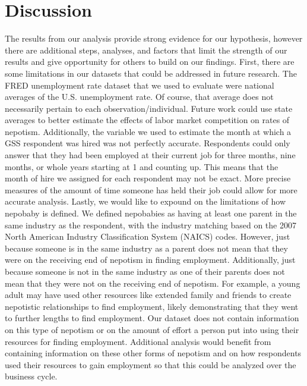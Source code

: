 \documentclass[12pt]{article}
\begin{document}
 



\section{Discussion}
\label{sec:discussion}
The results from our analysis provide strong evidence for our hypothesis, however there are additional steps, analyses, and factors that limit the strength of our results and give opportunity for others to build on our findings. First, there are some limitations in our datasets that could be addressed in future research. The FRED unemployment rate dataset that we used to evaluate were national averages of the U.S. unemployment rate. Of course, that average does not necessarily pertain to each observation/individual. Future work could use state averages to better estimate the effects of labor market competition on rates of nepotism. Additionally, the variable we used to estimate the month at which a GSS respondent was hired was not perfectly accurate. Respondents could only answer that they had been employed at their current job for three months, nine months, or whole years starting at 1 and counting up. This means that the month of hire we assigned for each respondent may not be exact. More precise measures of the amount of time someone has held their job could allow for more accurate analysis. Lastly, we would like to expound on the limitations of how nepobaby is defined. We defined nepobabies as having at least one parent in the same industry as the respondent, with the industry matching based on the 2007 North American Industry Classification System (NAICS) codes. However, just because someone is in the same industry as a parent does not mean that they were on the receiving end of nepotism in finding employment. Additionally, just because someone is not in the same industry as one of their parents does not mean that they were not on the receiving end of nepotism. For example, a young adult may have used other resources like extended family and friends to create nepotistic relationships to find employment, likely demonstrating that they went to further lengths to find employment. Our dataset does not contain information on this type of nepotism or on the amount of effort a person put into using their resources for finding employment. Additional analysis would benefit from containing information on these other forms of nepotism and on how respondents used their resources to gain employment so that this could be analyzed over the business cycle.
\end{document}

